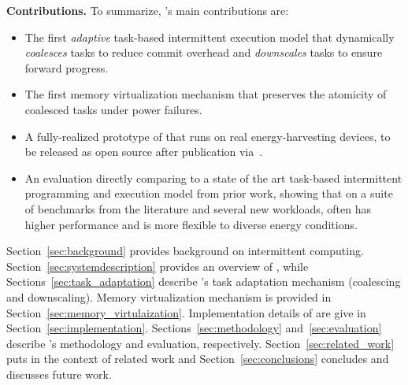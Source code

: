 %
%
%

\textbf{Contributions.} To summarize, \sys's main contributions are: 
%
\begin{itemize}
\item The first {\em adaptive} task-based intermittent execution model that
dynamically \emph{coalesces} tasks to reduce commit overhead and
\emph{downscales} tasks to ensure forward progress.
\item The first memory virtualization mechanism that preserves the atomicity of coalesced tasks under power failures.
\item A fully-realized prototype of \sys that runs on real energy-harvesting devices, to be released as open source after publication via~\cite{coala_website}. 
\item An evaluation directly comparing \sys to a state of the art task-based
intermittent programming and execution model from prior work, showing that on a
suite of benchmarks from the literature and several new workloads, \sys often
has higher performance and is more flexible to diverse energy conditions. 
\end{itemize}
%
Section~\ref{sec:background} provides background on intermittent computing.
Section~\ref{sec:systemdescription} provides an overview of \sys, while
Sections~\ref{sec:task_adaptation} describe \sys's task adaptation mechanism (coalescing and downscaling). Memory virtualization mechanism is provided in Section~\ref{sec:memory_virtulaization}. Implementation details of \sys are give in Section~\ref{sec:implementation}. Sections~\ref{sec:methodology} and~\ref{sec:evaluation} describe \sys's methodology and evaluation, respectively. Section~\ref{sec:related_work} puts \sys in the
context of related work and Section~\ref{sec:conclusions} concludes and discusses
future work.
